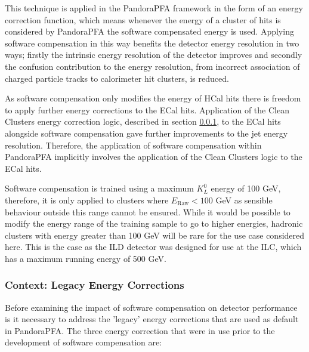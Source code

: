 This technique is applied in the PandoraPFA framework in the form of an energy correction function, which means whenever the energy of a cluster of hits is considered by PandoraPFA the software compensated energy is used.  Applying software compensation in this way benefits the detector energy resolution in two ways; firstly the intrinsic energy resolution of the detector improves and secondly the confusion contribution to the energy resolution, from incorrect association of charged particle tracks to calorimeter hit clusters, is reduced.  

As software compensation only modifies the energy of HCal hits there is freedom to apply further energy corrections to the ECal hits.  Application of the Clean Clusters energy correction logic, described in section \ref{sec:legacycorrections}, to the ECal hits alongside software compensation gave further improvements to the jet energy resolution.  Therefore, the application of software compensation within PandoraPFA implicitly involves the application of the Clean Clusters logic to the ECal hits.  

Software compensation is trained using a maximum $K^{0}_{L}$ energy of 100 GeV, therefore, it is only applied to clusters where $E_{\text{Raw}} < 100$ GeV as sensible behaviour outside this range cannot be ensured.  While it would be possible to modify the energy range of the training sample to go to higher energies, hadronic clusters with energy greater than 100 GeV will be rare for the use case considered here.  This is the case as the ILD detector was designed for use at the ILC, which has a maximum running energy of 500 GeV.  


\subsubsection{Context: Legacy Energy Corrections}
\label{sec:legacycorrections}
Before examining the impact of software compensation on detector performance is it necessary to address the 'legacy' energy corrections that are used as default in PandoraPFA.  The three energy correction that were in use prior to the development of software compensation are:

